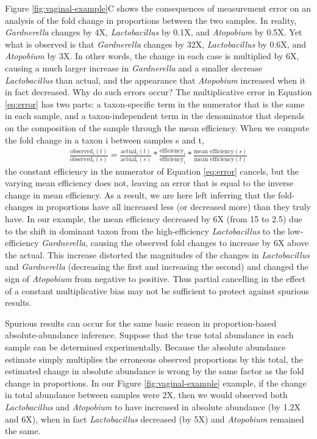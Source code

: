 \documentclass[
]{article}
\theoremstyle{definition}
\theoremstyle{definition}
\theoremstyle{definition}
\theoremstyle{definition}
\theoremstyle{remark}
\begin{document}
Figure \ref{fig:vaginal-example}C shows the consequences of measurement error on an analysis of the fold change in proportions between the two samples.
In reality, \emph{Gardnerella} changes by 4X, \emph{Lactobacillus} by 0.1X, and \emph{Atopobium} by 0.5X.
Yet what is observed is that \emph{Gardnerella} changes by 32X, \emph{Lactobacillus} by 0.6X, and \emph{Atopobium} by 3X.
In other words, the change in each case is multiplied by 6X, causing a much larger increase in \emph{Gardnerella} and a smaller decrease \emph{Lactobacillus} than actual, and the appearance that \emph{Atopobium} increased when it in fact decreased.
Why do such errors occur?
The multiplicative error in Equation \eqref{eq:error} has two parts: a taxon-specific term in the numerator that is the same in each sample, and a taxon-independent term in the denominator that depends on the composition of the sample through the mean efficiency.
When we compute the fold change in a taxon i between samples s and t,
\begin{align}
  \frac{\text{observed}_{i}(t)}{\text{observed}_{i}(s)}=\frac{\text{actual}_{i}(t)}{\text{actual}_{i}(s)}*\frac{\text{efficiency}_{i}}{\text{efficiency}_{i}}*\frac{\text{mean efficiency}(s)}{\text{mean efficiency}(t)}
\end{align}
the constant efficiency in the numerator of Equation \eqref{eq:error} cancels, but the varying mean efficiency does not, leaving an error that is equal to the inverse change in mean efficiency.
As a result, we are here left inferring that the fold-changes in proportions have all increased less (or decreased more) than they truly have.
In our example, the mean efficiency decreased by 6X (from 15 to 2.5) due to the shift in dominant taxon from the high-efficiency \emph{Lactobacillus} to the low-efficiency \emph{Gardnerella}, causing the observed fold changes to increase by 6X above the actual.
This increase distorted the magnitudes of the changes in \emph{Lactobacillus} and \emph{Gardnerella} (decreasing the first and increasing the second) and changed the sign of \emph{Atopobium} from negative to positive.
Thus partial cancelling in the effect of a constant multiplicative bias may not be sufficient to protect against spurious results.

Spurious results can occur for the same basic reason in proportion-based absolute-abundance inference.
Suppose that the true total abundance in each sample can be determined experimentally.
Because the absolute abundance estimate simply multiplies the erroneous observed proportions by this total, the estimated change in absolute abundance is wrong by the same factor as the fold change in proportions.
In our Figure \ref{fig:vaginal-example} example, if the change in total abundance between samples were 2X, then we would observed both \emph{Lactobacillus} and \emph{Atopobium} to have increased in absolute abundance (by 1.2X and 6X), when in fact \emph{Lactobacillus} decreased (by 5X) and \emph{Atopobium} remained the same.
\end{document}
